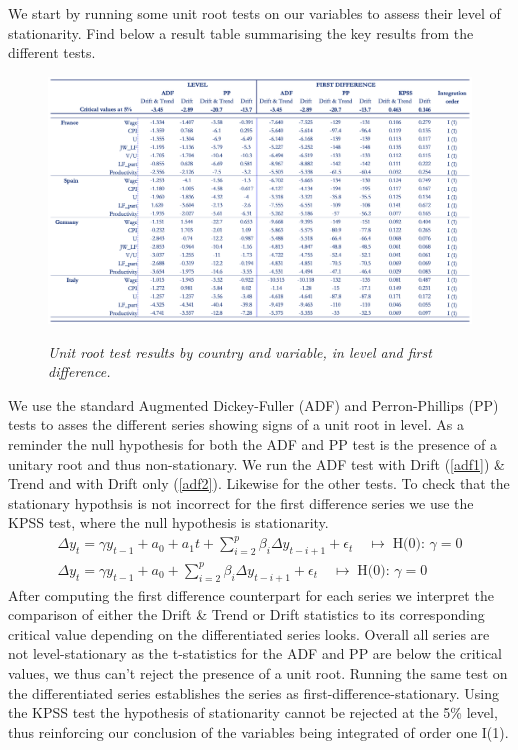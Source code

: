 We start by running some unit root tests on our variables to assess their level of stationarity.
Find below a result table summarising the key results from the different tests.

\begin{figure}[H]
    \centering
    \caption{\textit{Unit root test results by country and variable, in level and first difference.}}
    \includegraphics[width=1\textwidth]{Core/2.Labour/img/unit_root.png}
    \label{figure:Labour_ur}
\end{figure}
\vspace{-1cm}
We use the standard Augmented Dickey-Fuller (ADF) and Perron-Phillips (PP) tests to asses the different series showing signs of a unit root in level. 
As a reminder the null hypothesis for both the ADF and PP test is the presence of a unitary root and thus non-stationary. 
We run the ADF test with Drift (\ref{adf1}) \& Trend and with Drift only (\ref{adf2}). Likewise for the other tests. To check that the stationary hypothsis is not incorrect for the first difference series we use the KPSS test, where the null hypothesis is stationarity.
\begin{align}
    \Delta y_{t} = \gamma y_{t-1} + a_{0} + a_{1}t + \sum_{i=2}^{p}\beta_{i} \Delta y_{t-i+1} + \epsilon_{t} \quad \longmapsto \; \textrm{H(0): } \gamma = 0 \label{adf1} \\
    \Delta y_{t} = \gamma y_{t-1} + a_{0} + \sum_{i=2}^{p}\beta_{i} \Delta y_{t-i+1} + \epsilon_{t} \quad \longmapsto \; \textrm{H(0): } \gamma = 0 \label{adf2}
\end{align}
\quad After computing the first difference counterpart for each series we interpret the comparison of either the Drift \& Trend or Drift statistics to its corresponding critical value depending on the differentiated series looks. 
Overall all series are not level-stationary as the  t-statistics for the ADF and PP are below the critical values, we thus can’t reject the presence of a unit root. 
Running the same test on the differentiated series establishes the series as first-difference-stationary. Using the KPSS test the hypothesis of stationarity cannot be rejected at the 5\% level, thus reinforcing our conclusion of the variables being integrated of order one I(1).

